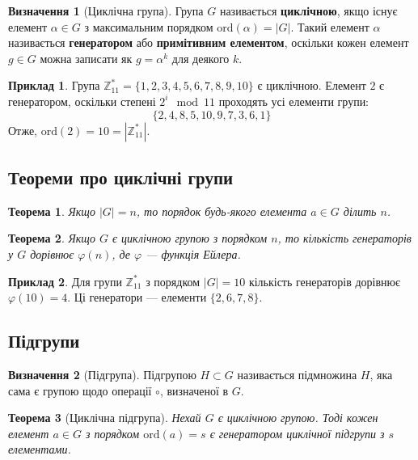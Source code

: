 \documentclass[12pt]{report}
\theoremstyle{definition}
\newtheorem{definition}{Визначення}[chapter]
\newtheorem{example}{Приклад}[chapter]
\theoremstyle{plain}
\newtheorem{theorem}{Теорема}[chapter]
\begin{document}
\begin{definition}[Циклічна група]
Група \( G \) називається \textbf{циклічною}, якщо існує елемент \( \alpha \in G \) з максимальним порядком \( \text{ord}(\alpha) = |G| \). Такий елемент \( \alpha \) називається \textbf{генератором} або \textbf{примітивним елементом}, оскільки кожен елемент \( g \in G \) можна записати як \( g = \alpha^k \) для деякого \( k \).
\end{definition}

\begin{example}
Група \( \mathbb{Z}^*_{11} = \{1, 2, 3, 4, 5, 6, 7, 8, 9, 10\} \) є циклічною. Елемент \( 2 \) є генератором, оскільки степені \( 2^i \mod 11 \) проходять усі елементи групи:
\[
\{2, 4, 8, 5, 10, 9, 7, 3, 6, 1\}
\]
Отже, \( \text{ord}(2) = 10 = |\mathbb{Z}^*_{11}| \).
\end{example}

\subsection{Теореми про циклічні групи}

\begin{theorem}
Якщо \( |G| = n \), то порядок будь-якого елемента \( a \in G \) ділить \( n \).
\end{theorem}

\begin{theorem}
Якщо \( G \) є циклічною групою з порядком \( n \), то кількість генераторів у \( G \) дорівнює \( \varphi(n) \), де \( \varphi \) — функція Ейлера.
\end{theorem}

\begin{example}
Для групи \( \mathbb{Z}^*_{11} \) з порядком \( |G| = 10 \) кількість генераторів дорівнює \( \varphi(10) = 4 \). Ці генератори — елементи \( \{2, 6, 7, 8\} \).
\end{example}

\subsection{Підгрупи}

\begin{definition}[Підгрупа]
Підгрупою \( H \subset G \) називається підмножина \( H \), яка сама є групою щодо операції \( \circ \), визначеної в \( G \).
\end{definition}

\begin{theorem}[Циклічна підгрупа]
Нехай \( G \) є циклічною групою. Тоді кожен елемент \( a \in G \) з порядком \( \text{ord}(a) = s \) є генератором циклічної підгрупи з \( s \) елементами.
\end{theorem}
\end{document}
